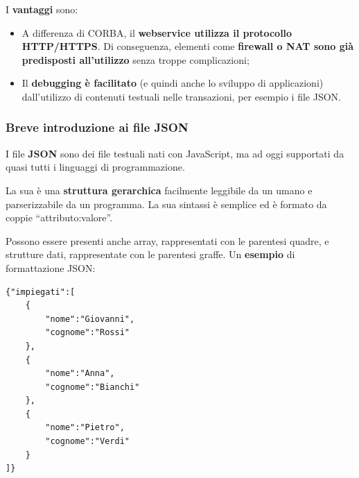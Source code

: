 \documentclass[a4paper]{article}
\newcommand{\dquotes}[1]{``#1''}
\begin{document}
	\noindent
	I \textcolor{Green4}{\textbf{vantaggi}} sono:
	\begin{itemize}
		\item A differenza di CORBA, il \textbf{webservice utilizza il protocollo HTTP/HTTPS}. Di conseguenza, elementi come \textbf{firewall o NAT sono già predisposti all'utilizzo} senza troppe complicazioni;
		
		\item Il \textbf{debugging è facilitato} (e quindi anche lo sviluppo di applicazioni) dall'utilizzo di contenuti testuali nelle transazioni, per esempio i file JSON.
	\end{itemize}\newpage
	
	\subsubsection{Breve introduzione ai file JSON}
	
	I file \textcolor{Red3}{\textbf{JSON}} sono dei file testuali nati con JavaScript, ma ad oggi supportati da quasi tutti i linguaggi di programmazione.\newline
	
	\noindent
	La sua è una \textbf{struttura gerarchica} facilmente leggibile da un umano e parserizzabile da un programma. La sua sintassi è semplice ed è formato da coppie \dquotes{\textsf{attributo:valore}}.\newline
	
	\noindent
	Possono essere presenti anche array, rappresentati con le parentesi quadre, e strutture dati, rappresentate con le parentesi graffe. Un \textcolor{Green4}{\textbf{esempio}} di formattazione JSON:
	\begin{lstlisting}
{"impiegati":[
	{
		"nome":"Giovanni",
		"cognome":"Rossi"
	},
	{
		"nome":"Anna",
		"cognome":"Bianchi"
	},
	{
		"nome":"Pietro",
		"cognome":"Verdi"
	}
]}\end{lstlisting}
\end{document}
